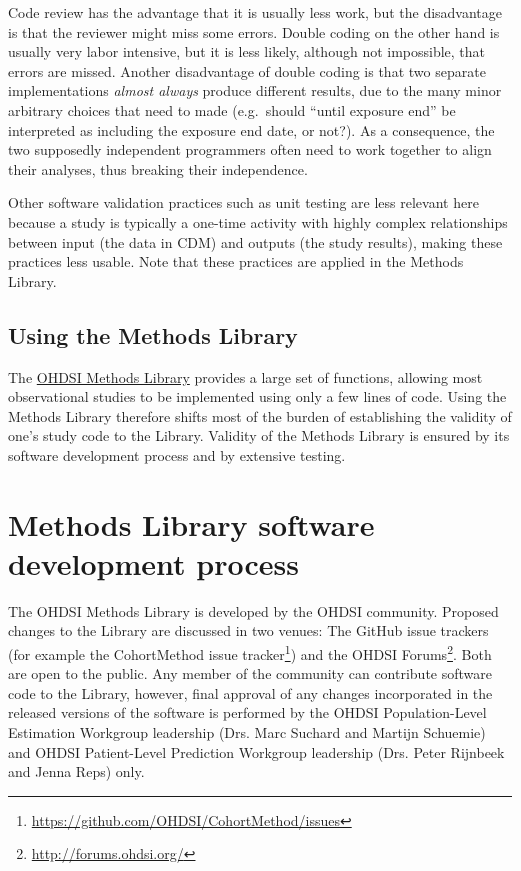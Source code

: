 \documentclass[11pt]{book}
\let\rmarkdownfootnote\footnote%
\def\footnote{\protect\rmarkdownfootnote}
\theoremstyle{definition}
\theoremstyle{definition}
\theoremstyle{definition}
\theoremstyle{remark}
\begin{document}
Code review has the advantage that it is usually less work, but the disadvantage is that the reviewer might miss some errors. Double coding on the other hand is usually very labor intensive, but it is less likely, although not impossible, that errors are missed. Another disadvantage of double coding is that two separate implementations \emph{almost always} produce different results, due to the many minor arbitrary choices that need to made (e.g.~should ``until exposure end'' be interpreted as including the exposure end date, or not?). As a consequence, the two supposedly independent programmers often need to work together to align their analyses, thus breaking their independence.

Other software validation practices such as unit testing are less relevant here because a study is typically a one-time activity with highly complex relationships between input (the data in CDM) and outputs (the study results), making these practices less usable. Note that these practices are applied in the Methods Library.

\hypertarget{using-the-methods-library}{%
\subsection{Using the Methods Library}\label{using-the-methods-library}}

The \href{https://ohdsi.github.io/MethodsLibrary/}{OHDSI Methods Library} provides a large set of functions, allowing most observational studies to be implemented using only a few lines of code. Using the Methods Library therefore shifts most of the burden of establishing the validity of one's study code to the Library. Validity of the Methods Library is ensured by its software development process and by extensive testing.

\hypertarget{methods-library-software-development-process}{%
\section{Methods Library software development process}\label{methods-library-software-development-process}}

The OHDSI Methods Library is developed by the OHDSI community. Proposed changes to the Library are discussed in two venues: The GitHub issue trackers (for example the CohortMethod issue tracker\footnote{\url{https://github.com/OHDSI/CohortMethod/issues}}) and the OHDSI Forums\footnote{\url{http://forums.ohdsi.org/}}. Both are open to the public. Any member of the community can contribute software code to the Library, however, final approval of any changes incorporated in the released versions of the software is performed by the OHDSI Population-Level Estimation Workgroup leadership (Drs. Marc Suchard and Martijn Schuemie) and OHDSI Patient-Level Prediction Workgroup leadership (Drs. Peter Rijnbeek and Jenna Reps) only.
\end{document}
